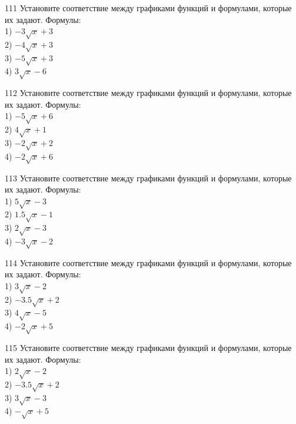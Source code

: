 \documentclass[4apaper]{article}
\begin{document}
\begin{taskBN}{111}
Установите соответствие между графиками функций и формулами, которые их задают. Формулы: \\1) $-3\sqrt{x}+3$\\2) $-4\sqrt{x}+3$\\3) $-5\sqrt{x}+3$\\4) $3\sqrt{x}-6$
\end{taskBN}

\begin{taskBN}{112}
Установите соответствие между графиками функций и формулами, которые их задают. Формулы: \\1) $-5\sqrt{x}+6$\\2) $4\sqrt{x}+1$\\3) $-2\sqrt{x}+2$\\4) $-2\sqrt{x}+6$
\end{taskBN}

\begin{taskBN}{113}
Установите соответствие между графиками функций и формулами, которые их задают. Формулы: \\1) $5\sqrt{x}-3$\\2) $1.5\sqrt{x}-1$\\3) $2\sqrt{x}-3$\\4) $-3\sqrt{x}-2$
\end{taskBN}

\begin{taskBN}{114}
Установите соответствие между графиками функций и формулами, которые их задают. Формулы: \\1) $3\sqrt{x}-2$\\2) $-3.5\sqrt{x}+2$\\3) $4\sqrt{x}-5$\\4) $-2\sqrt{x}+5$
\end{taskBN}

\begin{taskBN}{115}
Установите соответствие между графиками функций и формулами, которые их задают. Формулы: \\1) $2\sqrt{x}-2$\\2) $-3.5\sqrt{x}+2$\\3) $3\sqrt{x}-3$\\4) $-\sqrt{x}+5$
\end{taskBN}
\end{document}
